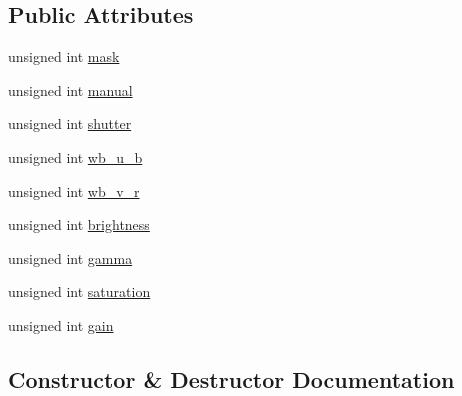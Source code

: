 \subsection*{Public Attributes}
\begin{DoxyCompactItemize}
\item 
unsigned int \hyperlink{classsvl_filter_source_video_capture_types_1_1_image_properties_aadc11f406c84e12e912e4d48a234ef6e}{mask}
\item 
unsigned int \hyperlink{classsvl_filter_source_video_capture_types_1_1_image_properties_a12fbae1318afe4d479f67601c4aefe01}{manual}
\item 
unsigned int \hyperlink{classsvl_filter_source_video_capture_types_1_1_image_properties_a86e0a67ff502430038dd3263322a19ad}{shutter}
\item 
unsigned int \hyperlink{classsvl_filter_source_video_capture_types_1_1_image_properties_a3f11dd2be120711075498c0711d77251}{wb\+\_\+u\+\_\+b}
\item 
unsigned int \hyperlink{classsvl_filter_source_video_capture_types_1_1_image_properties_a45583b41d5248ffc131b3982e14bab34}{wb\+\_\+v\+\_\+r}
\item 
unsigned int \hyperlink{classsvl_filter_source_video_capture_types_1_1_image_properties_a31815291569306b639a895d7db5e3962}{brightness}
\item 
unsigned int \hyperlink{classsvl_filter_source_video_capture_types_1_1_image_properties_a779634718935c5fe8c0d83cef288dcfe}{gamma}
\item 
unsigned int \hyperlink{classsvl_filter_source_video_capture_types_1_1_image_properties_a1660c2b14896b6d0c5a22074eaa92c01}{saturation}
\item 
unsigned int \hyperlink{classsvl_filter_source_video_capture_types_1_1_image_properties_a47b78658b3a68de6462f0777a2f78dfe}{gain}
\end{DoxyCompactItemize}


\subsection{Constructor \& Destructor Documentation}
\hypertarget{classsvl_filter_source_video_capture_types_1_1_image_properties_ad709e23a4f0e5f3856ac8626f7f8dc1d}{}
